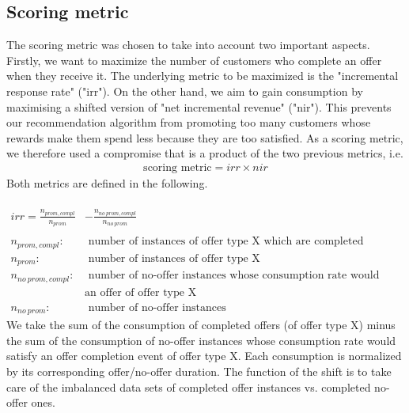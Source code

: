 \documentclass[11pt]{article} %
\begin{document}
\subsection{\label{Scoring metric}Scoring metric}
The scoring metric was chosen to take into account two important aspects.
Firstly, we want to maximize the number of customers who complete an offer when they receive it. The underlying metric to be maximized is the "incremental response rate" ("irr").
On the other hand, we aim to gain consumption by maximising a shifted version of "net incremental revenue" ("nir").
This prevents our recommendation algorithm from promoting too many customers whose rewards make them spend less because they are too satisfied.
As a scoring metric, we therefore used a compromise that is a product of the two previous metrics, i.e.
\begin{align}
\text{scoring metric}= irr \times nir
\end{align}
Both metrics are defined in the following.
%
\\
\\
\begin{align}
irr=\frac{ n_{prom,compl} }{ n_{prom}} &-\frac{ n_{no\ prom,compl} }{ n_{no\ prom}}
\\
\nonumber\\
n_{prom,compl}:& \text{\ number of instances of offer type X which are completed}\nonumber
\\
n_{prom}:& \text{\ number of instances of offer type X}\nonumber
\\
n_{no\ prom,compl}:& \text{\ number of no-offer instances whose consumption rate would have completed}\nonumber
\\
& \text{an offer of offer type X}\nonumber
\\
n_{no\ prom}:& \text{\ number of no-offer instances}\nonumber
\end{align}
We take the sum of the consumption of completed offers (of offer type X) minus the sum of the consumption of no-offer instances whose consumption rate would satisfy an offer completion event of offer type X.
Each consumption is normalized by its corresponding offer/no-offer duration. The function of the shift is to take care of the imbalanced data sets of completed offer instances vs. completed no-offer ones.
\end{document}
